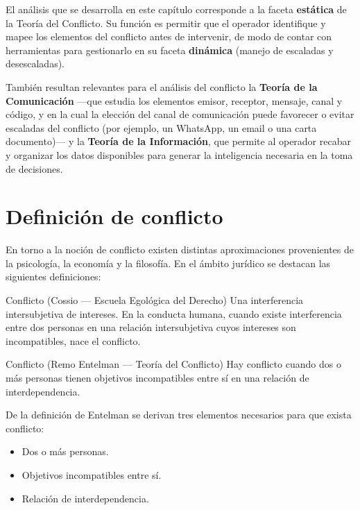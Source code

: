 \documentclass[12pt,oneside]{book}
\begin{document}
\begin{note}
El análisis que se desarrolla en este capítulo corresponde a la faceta \textbf{estática} de la Teoría del Conflicto. Su función es permitir que el operador identifique y mapee los elementos del conflicto antes de intervenir, de modo de contar con herramientas para gestionarlo en su faceta \textbf{dinámica} (manejo de escaladas y desescaladas).
\end{note}

También resultan relevantes para el análisis del conflicto la \textbf{Teoría de la Comunicación} ---que estudia los elementos emisor, receptor, mensaje, canal y código, y en la cual la elección del canal de comunicación puede favorecer o evitar escaladas del conflicto (por ejemplo, un WhatsApp, un email o una carta documento)--- y la \textbf{Teoría de la Información}, que permite al operador recabar y organizar los datos disponibles para generar la inteligencia necesaria en la toma de decisiones.

\section{Definición de conflicto}

En torno a la noción de conflicto existen distintas aproximaciones provenientes de la psicología, la economía y la filosofía. En el ámbito jurídico se destacan las siguientes definiciones:

\begin{definition}{Conflicto (Cossio --- Escuela Egológica del Derecho)}
Una interferencia intersubjetiva de intereses. En la conducta humana, cuando existe interferencia entre dos personas en una relación intersubjetiva cuyos intereses son incompatibles, nace el conflicto.
\end{definition}

\begin{definition}{Conflicto (Remo Entelman --- Teoría del Conflicto)}
Hay conflicto cuando dos o más personas tienen objetivos incompatibles entre sí en una relación de interdependencia.
\end{definition}


De la definición de Entelman se derivan tres elementos necesarios para que exista conflicto:

\begin{itemize}
    \item Dos o más personas.
    \item Objetivos incompatibles entre sí.
    \item Relación de interdependencia.
\end{itemize}
\end{document}
